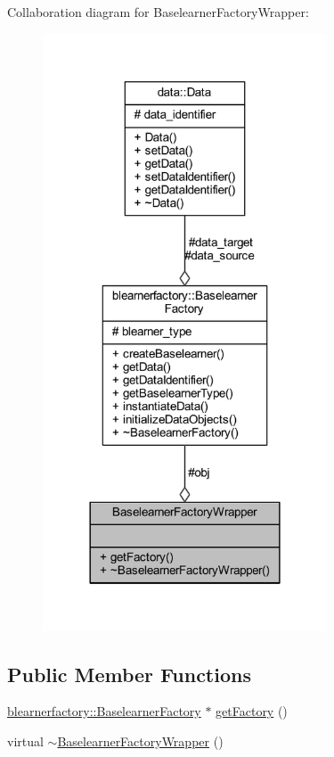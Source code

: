 Collaboration diagram for Baselearner\+Factory\+Wrapper\+:\nopagebreak
\begin{figure}[H]
\begin{center}
\leavevmode
\includegraphics[width=239pt]{class_baselearner_factory_wrapper__coll__graph}
\end{center}
\end{figure}
\subsection*{Public Member Functions}
\begin{DoxyCompactItemize}
\item 
\mbox{\hyperlink{classblearnerfactory_1_1_baselearner_factory}{blearnerfactory\+::\+Baselearner\+Factory}} $\ast$ \mbox{\hyperlink{class_baselearner_factory_wrapper_ac32811bfb4833aab5d11c7c303070485}{get\+Factory}} ()
\item 
virtual \mbox{\hyperlink{class_baselearner_factory_wrapper_a3c8ce56cb52b424af5369a7e3945b937}{$\sim$\+Baselearner\+Factory\+Wrapper}} ()
\end{DoxyCompactItemize}
